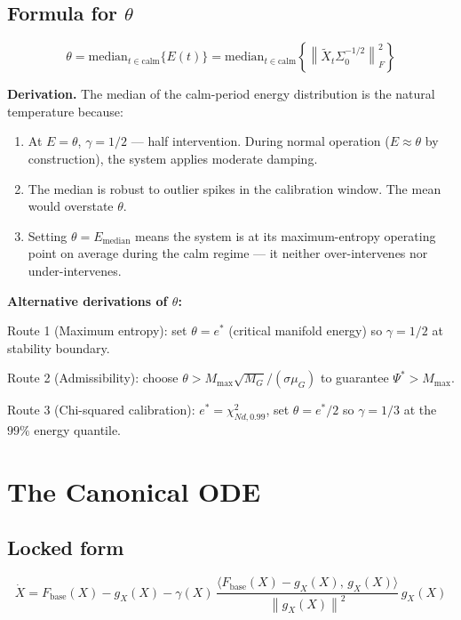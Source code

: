 \documentclass[11pt,a4paper]{article}
\theoremstyle{definition}
\newcommand{\norm}[1]{\left\|#1\right\|}
\newcommand{\inner}[2]{\langle #1,\,#2\rangle}
\newcommand{\Fbase}{F_{\mathrm{base}}}
\newcommand{\gX}{g_X}
\begin{document}
\subsection{Formula for $\theta$}

\begin{lockedbox}
\[
\theta = \mathrm{median}_{t \in \text{calm}}\{E(t)\}
= \mathrm{median}_{t \in \text{calm}}\left\{\norm{\tilde X_t \Sigma_0^{-1/2}}_F^2\right\}
\]
\end{lockedbox}

\textbf{Derivation.}
The median of the calm-period energy distribution is the natural temperature because:
\begin{enumerate}
\item At $E = \theta$, $\gamma = 1/2$ — half intervention. During normal operation ($E \approx \theta$ by construction), the system applies moderate damping.
\item The median is robust to outlier spikes in the calibration window. The mean would overstate $\theta$.
\item Setting $\theta = E_\text{median}$ means the system is at its maximum-entropy operating point on average during the calm regime — it neither over-intervenes nor under-intervenes.
\end{enumerate}

\textbf{Alternative derivations of $\theta$:}

Route 1 (Maximum entropy): set $\theta = e^*$ (critical manifold energy) so $\gamma = 1/2$ at stability boundary.

Route 2 (Admissibility): choose $\theta > M_\mathrm{max}\sqrt{M_G}/(\sigma\mu_G)$ to guarantee $\Psi^* > M_\mathrm{max}$.

Route 3 (Chi-squared calibration): $e^* = \chi^2_{Nd,0.99}$, set $\theta = e^*/2$ so $\gamma = 1/3$ at the $99\%$ energy quantile.

\section{The Canonical ODE}

\subsection{Locked form}

\begin{lockedbox}
\[
\dot X = \Fbase(X) - \gX(X) - \gamma(X)\,\frac{\inner{\Fbase(X)-\gX(X)}{\gX(X)}}{\norm{\gX(X)}^2}\,\gX(X)
\]
\end{lockedbox}
\end{document}
